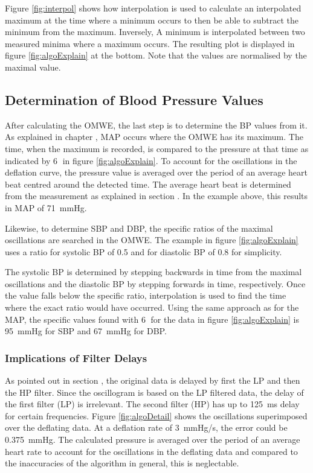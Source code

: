 Figure \ref{fig:interpol} shows how interpolation is used to calculate an interpolated maximum at the time where a minimum occurs to then be able to subtract the minimum from the maximum. Inversely, A minimum is interpolated between two measured minima where a maximum occurs. The resulting plot is displayed in figure \ref{fig:algoExplain} at the bottom. Note that the values are normalised by the maximal value.


\subsection{Determination of Blood Pressure Values}
After calculating the OMWE, the last step is to determine the BP values from it. As explained in chapter , MAP occurs where the OMWE has its maximum. The time, when the maximum is recorded, is compared to the pressure at that time as indicated by \textcircled{6} in figure \ref{fig:algoExplain}. To account for the oscillations in the deflation curve, the pressure value is averaged over the period of an average heart beat centred around the detected time. The average heart beat is determined from the measurement as explained in section . In the example above, this results in MAP of \SI{71}{\mmHg}.

Likewise, to determine SBP and DBP, the specific ratios of the maximal oscillations are searched in the OMWE. The example in figure \ref{fig:algoExplain} uses a ratio for systolic BP of 0.5 and for diastolic BP of 0.8 for simplicity.

The systolic BP is determined by stepping backwards in time from the maximal oscillations and the diastolic BP by stepping forwards in time, respectively. Once the value falls below the specific ratio, interpolation is used to find the time where the exact ratio would have occurred. Using the same approach as for the MAP, the specific values found with \textcircled{6} for the data in figure \ref{fig:algoExplain} is \SI{95}{\mmHg} for SBP and \SI{67}{\mmHg} for DBP.

\subsubsection{Implications of Filter Delays}\label{sec:impfilt}
As pointed out in section , the original data is delayed by first the LP and then the HP filter. Since the oscillogram is based on the LP filtered data, the delay of the first filter (LP) is irrelevant. The second filter (HP) has up to \SI{125}{\milli\second} delay for certain frequencies. Figure \ref{fig:algoDetail} shows the oscillations superimposed over the deflating data. At a deflation rate of \SI{3}{\mmHg/\second}, the error could be \SI{0.375}{\mmHg}. The calculated pressure is averaged over the period of an average heart rate to account for the oscillations in the deflating data and compared to the inaccuracies of the algorithm in general, this is neglectable. 


